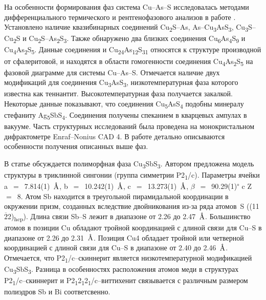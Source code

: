На особенности формирования фаз система Cu--As--S исследовалась методами дифференциального термического и рентгенофазового анализов в работе \cite{Kurz_1989}. Установлено наличие квазибинарных соединений Cu\textsubscript{2}S--As, As--Cu\textsubscript{3}AsS\textsubscript{3}, Cu\textsubscript{3}S--Cu\textsubscript{2}S и Cu\textsubscript{2}S--As\textsubscript{2}S\textsubscript{3}. Также обнаружено два близких соединения Cu\textsubscript{6}As\textsubscript{4}S\textsubscript{9} и Cu\textsubscript{4}As\textsubscript{2}S\textsubscript{5}. Данные соединения и Cu\textsubscript{24}As\textsubscript{12}S\textsubscript{31} относятся к структуре производной от сфалеритовой, и находятся в области гомогенности соединения Cu\textsubscript{4}As\textsubscript{2}S\textsubscript{5} на фазовой диаграмме для системы  Cu--As--S. Отмечается наличие двух модификаций для соединения Cu\textsubscript{3}AsS\textsubscript{3}, низкотемпературная фаза которого известна как теннантит. Высокотемпературная фаза получается закалкой. Некоторые данные показывают, что соединения Cu\textsubscript{5}AsS\textsubscript{4} подобны минералу стефаниту Ag\textsubscript{5}SbS\textsubscript{4}. Соединения получены спеканием в кварцевых ампулах в вакууме. Часть структурных исследований была проведена на монокристальном дифрактометре Enraf--Nonius CAD 4. В работе детально описываются особенности получения описанных выше фаз.

В статье \cite{Makovicky1995} обсуждается полиморфная фаза Cu\textsubscript{3}SbS\textsubscript{3}. Автором предложена модель  структуры в триклинной сингонии (группа симметрии P2\textsubscript{1}/c). Параметры ячейки a~$=$~7.814(1)~$\mbox{\normalfont\AA}$, b~$=$~10.242(1)~$\mbox{\normalfont\AA}$, c~$=$~13.273(1)~$\mbox{\normalfont\AA}$, $\beta$~$=$~90.29(1)\textsuperscript{$\circ$} c Z~$=$~8. Атом Sb находится в треугольной пирамидальной координации в окружении призм, созданных вследствие двойникования из-за ряда атомов~S ((11$\overline{\!2}$2)\textsubscript{hcp}). Длина связи Sb--S лежит в диапазоне от 2.26 до 2.47~$\mbox{\normalfont\AA}$. Большинство атомов в позиции Cu обладают тройной координацией с длиной связи для Cu--S в диапазоне от 2.26 до 2.31~$\mbox{\normalfont\AA}$. Позиция Cu4 обладает тройной или четверной координацией с длиной связи для Cu--S в диапазоне от 2.40 до 2.46~$\mbox{\normalfont\AA}$. Отмечается, что P2\textsubscript{1}/c--скиннерит является низкотемпературной модификацией Cu\textsubscript{3}SbS\textsubscript{3}. Разница в особенностях расположения атомов меди в структурах P2\textsubscript{1}/c--скиннерит и P2\textsubscript{1}2\textsubscript{1}2\textsubscript{1}/c--виттихенит связывается с различным размером полиэдров Sb и Bi соответсвенно. 

